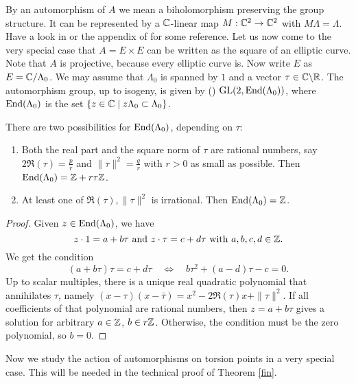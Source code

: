 By an automorphism of $A$ we mean a biholomorphism preserving the group structure. It can be represented by a $\mathbb{C}$-linear map $ M:\mathbb{C}^2 \rightarrow \mathbb{C}^2$ with $M\Lambda =\Lambda$. Have a look in \cite{Fujiki} or the appendix of \cite{Ghys} for some reference.
Let us now come to the very special case that $A=E\times E$ can be written as the square of an elliptic curve. Note that $A$ is projective, because every elliptic curve is. 
Now write $E$ as $E=\mathbb{C}/\Lambda_0$. We may assume that $\Lambda_0 $ is spanned by $1$ and a vector $\tau\in\mathbb{C}\backslash\mathbb{R}$. The automorphism group, up to isogeny, is given by (\cite{Ghys})
$\operatorname{GL}(2,\operatorname{End}(\Lambda_0))$, where
$\operatorname{End}(\Lambda_0)$ is the set $\{z\in\mathbb{C} \;|\; z\Lambda_0\subset \Lambda_0\}$.
\begin{proposition} \label{EndLambda}
There are two possibilities for $\operatorname{End}(\Lambda_0)$, depending on $\tau$:
\begin{enumerate}
 \item Both the real part and the square norm of $\tau$ are rational numbers, say $2\Re(\tau) = \frac{p}{r}$ and $\|\tau\|^2 = \frac{q}{r}$ with $r>0$ as small as possible. Then $\operatorname{End}(\Lambda_0)= \mathbb{Z}+ r\tau\mathbb{Z}$.
 \item At least one of $\Re(\tau), \|\tau\|^2$ is irrational. Then $\operatorname{End}(\Lambda_0)=\mathbb{Z}$.
\end{enumerate}
\end{proposition}
\begin{proof}
Given $z\in\operatorname{End}(\Lambda_0)$, we have $$z\cdot 1 = a + b\tau\text{ and }z\cdot \tau = c+ d\tau\text{ with }a,b,c,d\in \mathbb{Z}.$$ 
We get the condition
$$
(a+b\tau)\tau = c+d\tau\quad \Leftrightarrow \quad b\tau^2 + (a-d)\tau -c =0.
$$
Up to scalar multiples, there is a unique real quadratic polynomial that annihilates $\tau$, namely $ (x -\tau )(x-\bar{\tau})=x^2 - 2\Re(\tau)x+ \|\tau\|^2$. 
If all coefficients of that polynomial are rational numbers, then $z=a+b\tau$ gives a solution for arbitrary $a\in\mathbb{Z}$, $b\in r\mathbb{Z}$. Otherwise, the condition must be the zero polynomial, so $b=0$.
\end{proof}
Now we study the action of automorphisms on torsion points in a very special case. This will be needed in the technical proof of Theorem \ref{fin}.
